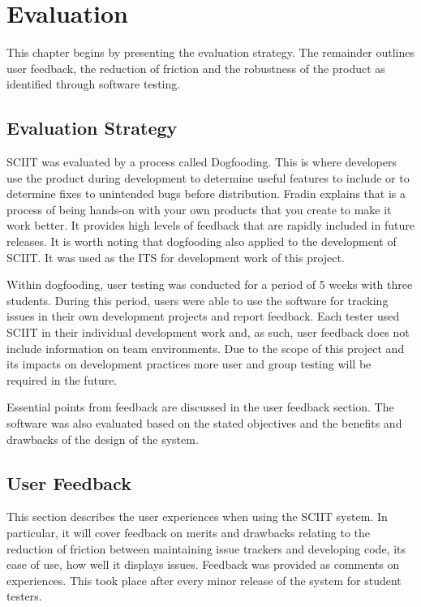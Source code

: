 \documentclass{mproj}
\begin{document}
\chapter{Evaluation}\label{evaluation}

This chapter begins by presenting the evaluation strategy. The remainder outlines user feedback, the reduction of friction and the robustness of the product as identified through software testing. 

\section{Evaluation Strategy}

SCIIT was evaluated by a process called Dogfooding. This is where developers use the product during development to determine useful features to include or to determine fixes to unintended bugs before distribution. Fradin \cite{Dogfooding} explains that is a process of being hands-on with your own products that you create to make it work better. It provides high levels of feedback that are rapidly included in future releases. It is worth noting that dogfooding also applied to the development of SCIIT. It was used as the ITS for development work of this project.

Within dogfooding, user testing was conducted for a period of 5 weeks with three students. During this period, users were able to use the software for tracking issues in their own development projects and report feedback. Each tester used SCIIT in their individual development work and, as such, user feedback does not include information on team environments. Due to the scope of this project and its impacts on development practices more user and group testing will be required in the future. 

Essential points from feedback are discussed in the user feedback section. The software was also evaluated based on the stated objectives and the benefits and drawbacks of the design of the system.


\section{User Feedback}

This section describes the user experiences when using the SCIIT system. In particular, it will cover feedback on merits and drawbacks relating to the reduction of friction between maintaining issue trackers and developing code, its ease of use, how well it displays issues. Feedback was provided as comments on experiences. This took place after every minor release of the system for student testers.
\end{document}
